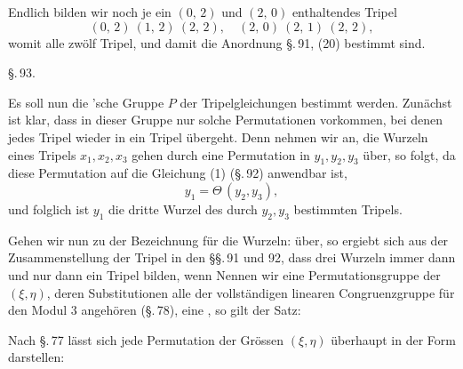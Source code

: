 
Endlich bilden wir noch je ein $(0,\,2)$ und $(2,\,0)$ enthaltendes
Tripel
\[
(0,\,2)\ (1,\,2)\ (2,\,2), \quad (2,\,0)\ (2,\,1)\ (2,\,2),
\]
womit alle zwölf Tripel, und damit die Anordnung \S.\,91, (20)
bestimmt sind.

\S.\,93.


Es soll nun die 'sche Gruppe $P$ der Tripelgleichungen
bestimmt werden. Zunächst ist klar, dass in dieser Gruppe nur
solche Permutationen vorkommen, bei denen jedes Tripel wieder
in ein Tripel übergeht. Denn nehmen wir an, die Wurzeln eines
Tripels $x_1, x_2, x_3$ gehen durch eine Permutation in $y_1, y_2, y_3$
über, so folgt, da diese Permutation auf die Gleichung (1) (\S.\,92)
anwendbar ist,
\[
y_1 = \Theta\,(y_2, y_3),
\]
und folglich ist $y_1$ die dritte Wurzel des durch $y_2, y_3$ bestimmten
Tripels.

Gehen wir nun zu der Bezeichnung für die Wurzeln:
über, so ergiebt sich aus der Zusammenstellung der Tripel in
den §§.\,91 und 92, dass drei Wurzeln
immer dann und nur dann ein Tripel bilden, wenn
Nennen wir eine Permutationsgruppe der $(\xi, \eta)$, deren Substitutionen
 alle der vollständigen linearen Congruenzgruppe für
den Modul 3 angehören (\S.\,78), eine , so gilt
der Satz:


Nach \S.\,77 lässt sich jede Permutation der Grössen $(\xi, \eta)$
überhaupt in der Form darstellen:
